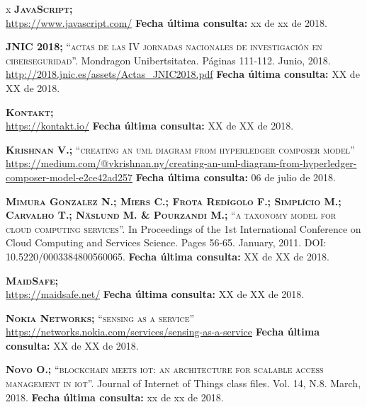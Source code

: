 \begin{thebibliography} {x}
	 \textsc{\textbf{JavaScript; }} \\ 
	\url{https://www.javascript.com/}
	\newline \textbf{Fecha última consulta:} xx de xx de 2018.
		
	 \textsc{\textbf{JNIC 2018; }}\textsc{“actas de las IV jornadas nacionales de investigación en ciberseguridad”.} Mondragon Unibertsitatea. Páginas 111-112. Junio, 2018. \\
	\url{http://2018.jnic.es/assets/Actas_JNIC2018.pdf}
	\newline \textbf{Fecha última consulta:} XX de XX de 2018.
	
	 \textsc{\textbf{Kontakt; }} \\
	\url{https://kontakt.io/}
	\newline \textbf{Fecha última consulta:} XX de XX de 2018.
	
	 \textsc{\textbf{Krishnan V.; }}\textsc{“creating an uml diagram from hyperledger composer model”} \\
	\url{https://medium.com/@vkrishnan.ny/creating-an-uml-diagram-from-hyperledger-composer-model-e2ce42ad257}
	\newline \textbf{Fecha última consulta:} 06 de julio de 2018.
		
	 \textsc{\textbf{Mimura Gonzalez N.; Miers C.; Frota Redígolo F.; Simplício M.; Carvalho T.; Näslund M. \& Pourzandi M.; }}\textsc{“a taxonomy model for cloud computing services”.} In Proceedings of the 1st International Conference on Cloud Computing and Services Science. Pages 56-65. January, 2011. DOI: 10.5220/0003384800560065.
	\newline \textbf{Fecha última consulta:} XX de XX de 2018.
	
	 \textsc{\textbf{MaidSafe; }} \\
	\url{https://maidsafe.net/}
	\newline \textbf{Fecha última consulta:} XX de XX de 2018.
	
	 \textsc{\textbf{Nokia Networks; }}\textsc{“sensing as a service”} \\ 
	\url{https://networks.nokia.com/services/sensing-as-a-service}
	\newline \textbf{Fecha última consulta:} XX de XX de 2018.
		
	 \textsc{\textbf{Novo O.; }} \textsc{“blockchain meets iot: an architecture for scalable access management in iot”.} Journal of Internet of Things class files. Vol. 14, N.8. March, 2018.	
	\newline \textbf{Fecha última consulta:} xx de xx de 2018.
	

\end{thebibliography}
